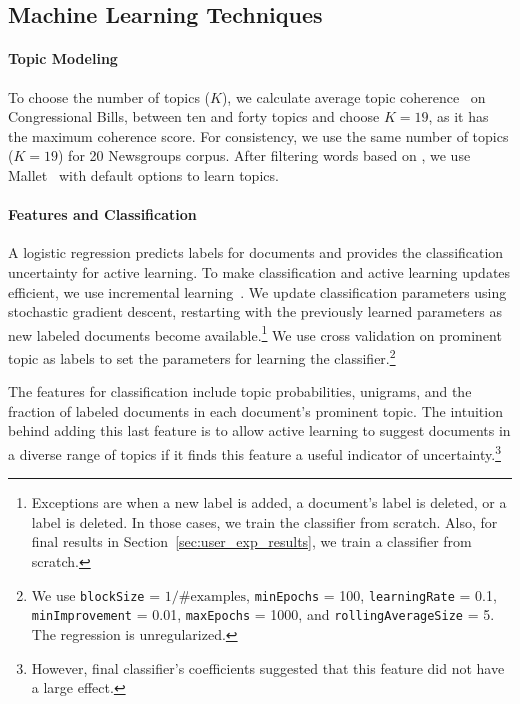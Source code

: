 \subsection{Machine Learning Techniques}

\paragraph{Topic Modeling}

To choose the number of topics ($K$), we calculate average topic
coherence~\cite{lau-tealeaves-14} on  Congressional Bills, between ten and
forty topics and choose $K=19$, as it has the maximum coherence
score.  For consistency, we use the same number of topics ($K=19$) for 20 Newsgroups corpus. After filtering words based on , we use
Mallet~\cite{mallet} with default options to learn topics. 



\paragraph{Features and Classification}





A logistic regression
predicts labels for documents and provides the classification uncertainty for
active learning.  To make classification and active learning updates efficient,
we use incremental learning~\cite[LingPipe]{lingpipe}. We update classification parameters
using stochastic gradient descent, restarting with the previously learned
parameters as new labeled documents become available.\footnote{Exceptions are
  when a new label is added, a document's label is deleted, or a label is
  deleted. In those cases, we train the classifier from scratch. Also, for final
  results in Section~\ref{sec:user_exp_results}, we train a classifier from
  scratch.}  We use cross validation on prominent topic as labels to set the parameters for
learning the classifier.\footnote{We use \texttt{blockSize} = $1/\#\textrm{examples}$, \texttt{minEpochs} = 100, \texttt{learningRate} = 0.1, \texttt{minImprovement} = 0.01, \texttt{maxEpochs} = 1000, and \texttt{rollingAverageSize} = 5. The regression is unregularized.}

The features for classification include topic probabilities, unigrams,
and the fraction of labeled documents in each document's prominent
topic. The intuition behind adding this last feature is to allow
active learning to suggest documents in a diverse range of topics if
it finds this feature a useful indicator of
uncertainty.\footnote{However, final classifier's coefficients suggested that this feature did not have a large
  effect.}










